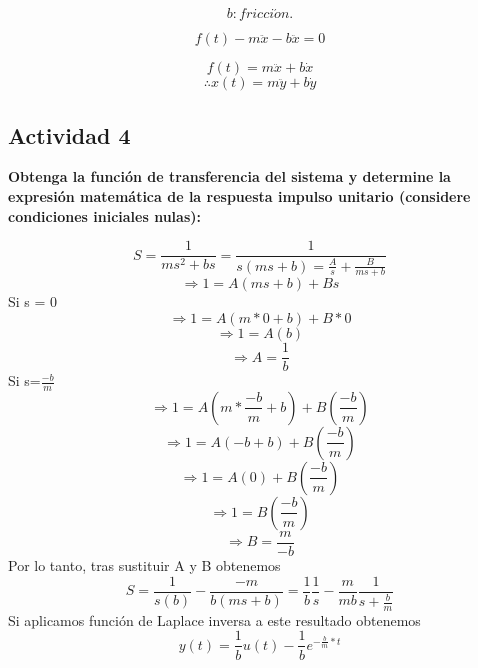 $$b:fricci\acute{o}n. $$

$$ f(t)-m \ddot{x}-b \ddot{x}=0 $$

$$f(t)=m\ddot{x}+b\dot{x}$$
$$\therefore x(t)=m\ddot{y}+b\dot{y}$$



\subsection{Actividad 4}
	
	\textbf{Obtenga la función de transferencia del sistema y determine la expresión matemática de la respuesta impulso unitario (considere condiciones iniciales nulas):}
		
	\begin{equation}
		S=\frac{1}{ms^2+bs}=\frac{1}{s(ms+b)=\frac{A}{s}+\frac{B}{ms+b}}
	\end{equation}
	\begin{equation}
		\Rightarrow 1=A(ms+b)+Bs
	\end{equation}
	Si s = 0
	\begin{equation}
		\Rightarrow 1=A(m*0+b)+B*0
	\end{equation}
	\begin{equation}
		\Rightarrow 1=A(b)
	\end{equation}
	\begin{equation}
		\Rightarrow A=\frac{1}{b}
	\end{equation}
	Si s=$\frac{-b}{m}$
	\begin{equation}
		\Rightarrow 1=A(m*\frac{-b}{m}+b)+B(\frac{-b}{m})
	\end{equation}
	\begin{equation}
		\Rightarrow 1=A(-b+b)+B(\frac{-b}{m})
	\end{equation}
	\begin{equation}
		\Rightarrow 1=A(0)+B(\frac{-b}{m})
	\end{equation}
	\begin{equation}
		\Rightarrow 1=B(\frac{-b}{m})
	\end{equation}
	\begin{equation}
		\Rightarrow B=\frac{m}{-b}
	\end{equation}
	Por lo tanto, tras sustituir A y B obtenemos
	\begin{equation}
		S=\frac{1}{s(b)}-\frac{-m}{b(ms+b)}=\frac{1}{b}\frac{1}{s}-\frac{m}{mb}\frac{1}{s+\frac{b}{m}}
	\end{equation}
	Si aplicamos función de Laplace inversa a este resultado obtenemos
	\begin{equation}
		y(t)=\frac{1}{b}u(t)-\frac{1}{b}e^{-\frac{b}{m}*t}
	\end{equation}
	
